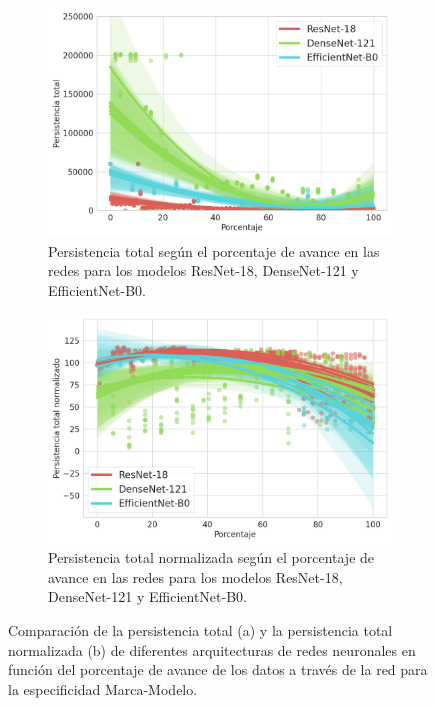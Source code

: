 \begin{figure}[H]
	\centering
	\begin{subfigure}{.5\textwidth}
		\centering
		\includegraphics[width=\linewidth]{img/m_arch.png}
		\caption{Persistencia total según el porcentaje de avance en las redes para los modelos ResNet-18, DenseNet-121 y EfficientNet-B0.}
		\label{fig:m-homology-arch-1}
	\end{subfigure}%
	\begin{subfigure}{.5\textwidth}
		\centering
		\includegraphics[width=\linewidth]{img/m_arch_norm.png}
		\caption{Persistencia total normalizada según el porcentaje de avance en las redes para los modelos ResNet-18, DenseNet-121 y EfficientNet-B0.}
		\label{fig:m-homology-arch-2}
	\end{subfigure}
	\caption{Comparación de la persistencia total (a) y la persistencia total normalizada (b) de diferentes arquitecturas de redes neuronales en función del porcentaje de avance de los datos a través de la red para la especificidad Marca-Modelo.}
	\label{fig:m-homology-arch}
\end{figure}

